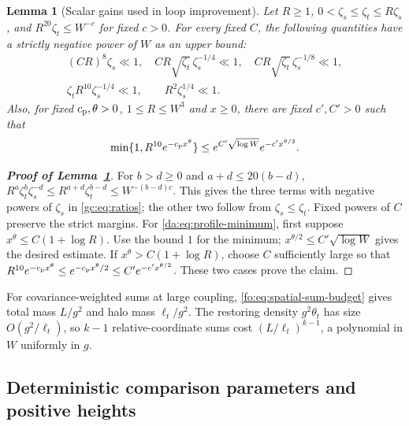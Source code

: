 \documentclass[11pt]{article}
\numberwithin{equation}{section}
\newtheorem{lemma}[theorem]{Lemma}
\theoremstyle{remark}
\begin{document}
\begin{lemma}[Scalar gains used in loop improvement]
\label{da:lem:profile-improvement}
Let $R\ge1$, $0<\zeta_s\le\zeta_t\le R\zeta_s$, and
$R^{20}\zeta_t\le W^{-c}$ for fixed $c>0$.
For every fixed $C$, the following quantities have a strictly negative
power of $W$ as an upper bound:
\begin{equation}\label{gc:eq:ratios}
 \begin{gathered}
 (CR)^8\zeta_s\ll1,\quad
 CR\sqrt{\zeta_t}\,\zeta_s^{-1/4}\ll1,\quad
 CR\sqrt{\zeta_t}\,\zeta_s^{-1/8}\ll1,\\
 \zeta_t R^{10}\zeta_s^{-1/4}\ll1,\qquad R^2\zeta_s^{1/4}\ll1.
 \end{gathered}
\end{equation}
Also, for fixed $c_{\rm p},\theta>0$, $1\le R\le W^3$ and $x\ge0$,
there are fixed $c',C'>0$ such that
\begin{equation}\label{da:eq:profile-minimum}
 \min\{1,R^{10}e^{-c_{\rm p}x^\theta}\}
 \le e^{C'\sqrt{\log W}}e^{-c'x^{\theta/2}}.
\end{equation}
\end{lemma}
\begin{proof}[\textbf{Proof of Lemma~\ref{da:lem:profile-improvement}}]
For $b>d\ge0$ and $a+d\le20(b-d)$,
$R^a\zeta_t^b\zeta_s^{-d}\le R^{a+d}\zeta_t^{b-d}
\le W^{-(b-d)c}$. This gives the three terms with negative powers
of $\zeta_s$ in \eqref{gc:eq:ratios}; the other two follow from
$\zeta_s\le\zeta_t$. Fixed powers of $C$ preserve the strict margins.
For \eqref{da:eq:profile-minimum}, first suppose
$x^\theta\le C(1+\log R)$. Use the bound $1$ for the minimum;
$x^{\theta/2}\le C'\sqrt{\log W}$ gives the desired estimate.
If $x^\theta>C(1+\log R)$, choose $C$ sufficiently large so that
$R^{10}e^{-c_{\rm p}x^\theta}\le e^{-c_{\rm p}x^\theta/2}
\le C'e^{-c'x^{\theta/2}}$. These two cases prove the claim.
\end{proof}

For covariance-weighted sums at large coupling,
\eqref{fo:eq:spatial-sum-budget} gives total mass $L/g^2$ and halo mass
$\ell_t/g^2$. The restoring density $g^2\theta_t$ has size
$O(g^2/\ell_t)$, so $k-1$ relative-coordinate sums cost
$(L/\ell_t)^{k-1}$, a polynomial in $W$ uniformly in $g$.


\subsection{Deterministic comparison parameters and positive heights}
\label{app:matching-parameters}
\end{document}
